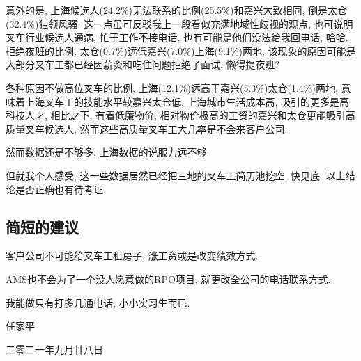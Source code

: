 意外的是, 上海候选人(24.2\%)无法联系的比例(25.5\%)和嘉兴大致相同, 倒是太仓(32.4\%)独领风骚. 这一点虽可反驳我上一段看似充满地域性歧视的观点, 也可说明叉车行业候选人通病, 忙于工作不接电话. 也有可能是他们没法给我回电话, 哈哈. 拒绝夜班的比例, 太仓(0.7\%)远低嘉兴(7.0\%)上海(9.1\%)两地, 该现象的原因可能是大部分叉车工都已经因薪资和吃住问题拒绝了面试, 懒得提夜班? 

各种原因不做高位叉车的比例, 上海(12.1\%)远高于嘉兴(5.3\%)太仓(1.4\%)两地, 意味着上海叉车工的技能水平较嘉兴太仓低, 上海城市生活成本高, 吸引的更多是高科技人才, 相比之下, 有着低廉物价, 相对物价极高的工资的嘉兴和太仓更能吸引高质量叉车候选人, 然而这些高质量叉车工大几率是不会来客户公司.

然而数据还是不够多, 上海数据的说服力远不够.

但就我个人感受, 这一些数据居然已经把三地的叉车工简历池挖空, 快见底. 以上结论是否正确也有待考证. 

\subsection{简短的建议}
客户公司不可能给叉车工租房子, 涨工资或是改变绩效方式. 

AMS也不会为了一个没人愿意做的RPO项目, 就更改全公司的电话联系方式. 

我能做只有打多几通电话, 小小实习生而已.

\begin{flushright}
    \bfseries

    任家平

    二零二一年九月廿八日
\end{flushright}